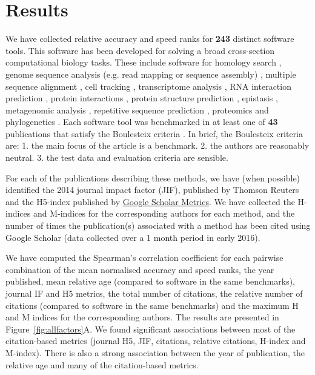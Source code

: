 \documentclass[fleqn,10pt]{SelfArx} %
\begin{document}
\section*{Results}
We have collected relative accuracy and speed ranks for \textbf{{\color{red}243}} distinct software tools. This software has been developed for solving a broad cross-section computational biology tasks. These include software for homology search \cite{Freyhult2007-et}, genome sequence analysis (e.g. read mapping or sequence assembly) \cite{Junemann2014-mb,Tran2014-pe,Zhang2011-nd,Abbas2014-gu,Bao2011-lv,Caboche2014-lj,Kleftogiannis2013-wi,Hatem2013-cs,Schbath2012-ob,Ruffalo2011-rl,Yang2013-aj,Holtgrewe2011-fd,Rackham2015-ag,Huang2015-wu}, multiple sequence alignment \cite{Thompson2011-rf,Nuin2006-nk,Pais2014-sr,Pervez2014-zp,Liu2010-rp}, cell tracking \cite{Maska2014-ak}, transcriptome analysis \cite{Li2012-wr,Lu2013-fs,Liu2014-kz,Kumar2016-xz}, RNA interaction prediction \cite{Pain2015-gr}, protein interactions \cite{Tikk2010-qd}, protein structure prediction \cite{Kolodny2005-ry,Wallner2005-qi}, epistasis \cite{Shang2011-vy},  metagenomic analysis \cite{Lindgreen2016-tt,Bazinet2012-wf}, repetitive sequence prediction \cite{Saha2008-kd}, proteomics \cite{Lange2008-pt,Yang2009-oc} and phylogenetics \cite{Liu2011-pz,Yang2011-dv,Oscamou2008-md,Bayzid2013-hc,Liu2009-lx}. Each software tool was benchmarked in at least one of \textbf{{\color{red}43}} publications that satisfy the Boulesteix criteria \cite{Boulesteix2013-vb}. In brief, the Boulesteix criteria are: 1. the main focus of the article is a benchmark. 2. the authors are reasonably neutral. 3. the test data and evaluation criteria are sensible.

For each of the publications describing these methods, we have (when possible) identified the 2014 journal impact factor (JIF), published by Thomson Reuters \cite{Garfield2006-lv} and the H5-index published by \href{https://scholar.google.co.nz/citations?view_op=top_venues&hl=en}{Google Scholar Metrics}. We have collected the H-indices and M-indices \cite{Hirsch2005-mt} for the corresponding authors for each method, and the number of times the publication(s) associated with a method has been cited using Google Scholar (data collected over a 1 month period in early 2016).

We have computed the Spearman’s correlation coefficient for each pairwise combination of the mean normalised accuracy and speed ranks, the year published, mean relative age (compared to software in the same benchmarks), journal IF and H5 metrics, the total number of citations, the relative number of citations (compared to software in the same benchmarks) and the maximum H and M indices for the corresponding authors. The results are presented in Figure~\ref{fig:allfactors}A. We found significant associations between most of the citation-based metrics (journal H5, JIF, citations, relative citations, H-index and M-index). There is also a strong association between the year of publication, the relative age and many of the citation-based metrics.
\end{document}
